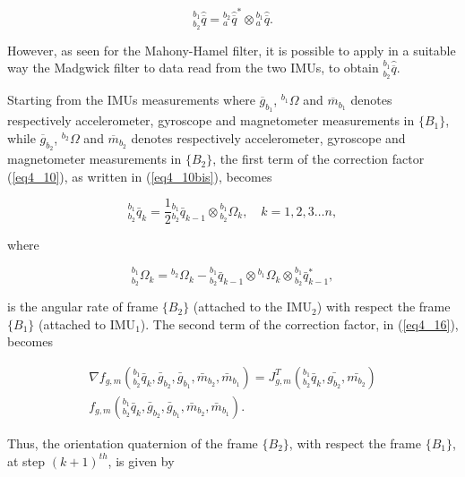 \begin{equation}
\label{eq4_18}
{^{b_1}_{b_2}\hat{\overline{q}}} = {_{a}^{b_2}\hat{\overline{q}}^{*}} \otimes {_{a}^{b_1}\hat{\overline{q}}}.
\end{equation}

However, as seen for the Mahony-Hamel filter, it is possible to apply in a suitable way the Madgwick filter to data read from the two IMUs, to obtain ${^{b_1}_{b_2}\hat{\overline{q}}}$.

Starting from the IMUs measurements where $\overline{g}_{b_1}$, $^{b_1} \Omega$ and $\overline{m}_{b_1}$ denotes respectively accelerometer, gyroscope and magnetometer measurements in $\{ B_1 \}$,  while $\overline{g}_{b_2}$, $^{b_2} \Omega$ and $\overline{m}_{b_2}$ denotes respectively accelerometer, gyroscope and magnetometer measurements in $\{ B_2 \}$, the first term of the correction factor (\ref{eq4_10}), as written in (\ref{eq4_10bis}), becomes

\begin{equation}
\label{eq4_19}
^{b_1}_{b_2} \bar{q}_k = \frac{1}{2} {^{b_1}_{b_2} \bar{q}_{k-1}} \otimes {^{b_1}_{b_2} \Omega_k},  \quad k = 1,2,3 \dots n,
\end{equation}

\noindent where

\begin{equation}
\label{eq4_20}
{^{b_1}_{b_2} \Omega_k} = {^{b_2} \Omega_k} - {^{b_1}_{b_2} \bar{q}_{k-1}} \otimes {^{b_1} \Omega_k} \otimes {^{b_1}_{b_2} \bar{q}^{*}_{k-1}},
\end{equation}

\noindent is the angular rate of frame $\{ B_2 \}$ (attached to the $\text{IMU}_2$) with respect the frame $\{ B_1 \}$ (attached to $\text{IMU}_1$). The second term of the correction factor, in (\ref{eq4_16}), becomes

\begin{equation}
\begin{split}
\label{eq4_21}
\nabla f_{g,m}(^{b_1}_{b_2} \bar{q}_k,\bar{g}_{b_2},\bar{g}_{b_1},\bar{m}_{b_2},\bar{m}_{b_1}) = J_{g,m}^T(^{b_1}_{b_2} \bar{q}_k, \bar{g_{b_2}},\bar{m_{b_2}}) \\ {f}_{g,m}(^{b_1}_{b_2} \bar{q}_k,\bar{g}_{b_2},\bar{g}_{b_1},\bar{m}_{b_2},\bar{m}_{b_1}).
\end{split}
\end{equation}

\noindent Thus, the orientation quaternion of the frame $\{ B_2 \}$, with respect the frame ${\{ B_1 \}}$, at step $(k+1)^{th}$, is given by

